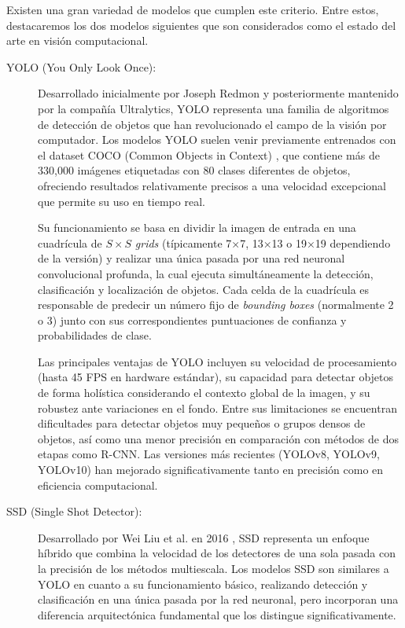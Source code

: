 Existen una gran variedad de modelos que cumplen este criterio. Entre estos, destacaremos los dos modelos siguientes que son considerados como el estado del arte en visión computacional.

\begin{description}
	\item[YOLO (You Only Look Once):] Desarrollado inicialmente por Joseph Redmon \cite{redmon2016you} y posteriormente mantenido por la compañía Ultralytics, YOLO representa una familia de algoritmos de detección de objetos que han revolucionado el campo de la visión por computador. Los modelos YOLO suelen venir previamente entrenados con el dataset COCO (Common Objects in Context) \cite{lin2014microsoft}, que contiene más de 330,000 imágenes etiquetadas con 80 clases diferentes de objetos, ofreciendo resultados relativamente precisos a una velocidad excepcional que permite su uso en tiempo real.
	
	Su funcionamiento se basa en dividir la imagen de entrada en una cuadrícula de $S \times S$ \textit{grids} (típicamente 7×7, 13×13 o 19×19 dependiendo de la versión) y realizar una única pasada por una red neuronal convolucional profunda, la cual ejecuta simultáneamente la detección, clasificación y localización de objetos. Cada celda de la cuadrícula es responsable de predecir un número fijo de \textit{bounding boxes} (normalmente 2 o 3) junto con sus correspondientes puntuaciones de confianza y probabilidades de clase.
	
	Las principales ventajas de YOLO incluyen su velocidad de procesamiento (hasta 45 FPS en hardware estándar), su capacidad para detectar objetos de forma holística considerando el contexto global de la imagen, y su robustez ante variaciones en el fondo. Entre sus limitaciones se encuentran dificultades para detectar objetos muy pequeños o grupos densos de objetos, así como una menor precisión en comparación con métodos de dos etapas como R-CNN. Las versiones más recientes (YOLOv8, YOLOv9, YOLOv10) han mejorado significativamente tanto en precisión como en eficiencia computacional.

	\item[SSD (Single Shot Detector):] Desarrollado por Wei Liu et al. en 2016 \cite{liu2016ssd}, SSD representa un enfoque híbrido que combina la velocidad de los detectores de una sola pasada con la precisión de los métodos multiescala. Los modelos SSD son similares a YOLO en cuanto a su funcionamiento básico, realizando detección y clasificación en una única pasada por la red neuronal, pero incorporan una diferencia arquitectónica fundamental que los distingue significativamente.
	

\end{description}
